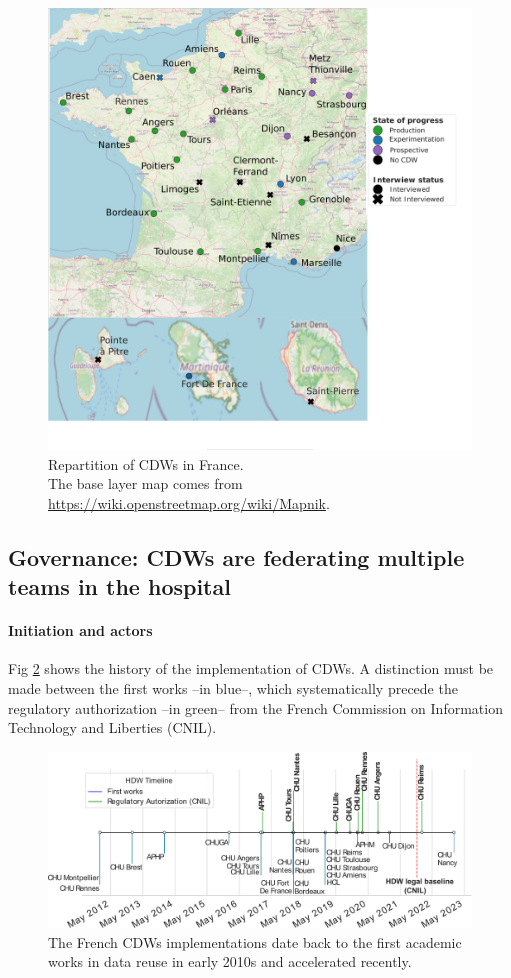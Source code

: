 \documentclass[french,12pt,twoside,a4paper]{book}
\begin{document}
\begin{figure}[!b]
  \centering
  \includegraphics[width=0.8\linewidth]{img/chapter_2/Fig2.pdf}
  \caption{Repartition of CDWs in France. \\The base layer map comes from
    \url{https://wiki.openstreetmap.org/wiki/Mapnik}.}
  \label{results:image:eds_map}
\end{figure}


\subsection{Governance: CDWs are federating multiple teams in the hospital}%
\label{subsec:cdw:results:governance}%

\paragraph{Initiation and actors}


Fig \ref{results:governance:image:timeline} shows the history of the
implementation of CDWs. A distinction must be made between the first works --in
blue--, which systematically precede the regulatory authorization --in green--
from the French Commission on Information Technology and Liberties (CNIL).

\begin{figure}
  \centering
  \includegraphics[width=\linewidth]{img/chapter_2/Fig3.pdf}
  \caption{The French CDWs implementations date back to the first academic works in data reuse in early 2010s and accelerated recently.}
  \label{results:governance:image:timeline}
\end{figure}
\end{document}
